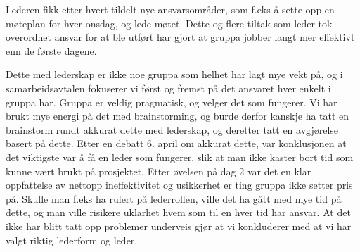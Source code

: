 Lederen fikk etter hvert tildelt nye ansvarsområder, som f.eks å sette opp en
møteplan for hver onsdag, og lede møtet. Dette og flere tiltak som leder tok
overordnet ansvar for at ble utført har gjort at gruppa jobber langt mer
effektivt enn de første dagene.

Dette med lederskap er ikke noe gruppa som helhet har lagt mye vekt på, og i
samarbeidsavtalen fokuserer vi først og fremst på det ansvaret hver enkelt i
gruppa har.  Gruppa er veldig pragmatisk, og velger det som fungerer. Vi har
brukt mye energi på det med brainstorming, og burde derfor kanskje ha tatt en
brainstorm rundt akkurat dette med lederskap, og deretter tatt en avgjørelse
basert på dette.  Etter en debatt 6. april om akkurat dette, var konklusjonen
at det viktigste var å få en leder som fungerer, slik at man ikke kaster bort
tid som kunne vært brukt på prosjektet. Etter øvelsen på dag 2 var det en klar
oppfattelse av nettopp ineffektivitet og usikkerhet er ting gruppa ikke setter
pris på. Skulle man f.eks ha rulert på lederrollen, ville det ha gått med mye
tid på dette, og man ville risikere uklarhet hvem som til en hver tid har
ansvar. At det ikke har blitt tatt opp problemer underveis gjør at vi
konkluderer med at vi har valgt riktig lederform og leder. 
